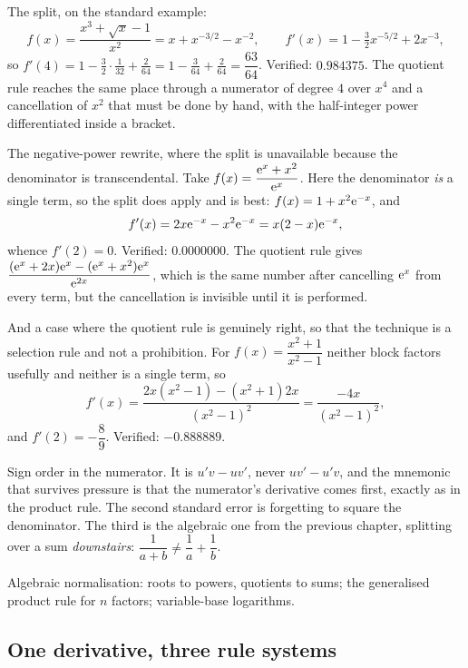 \begin{worked}
The split, on the standard example:
\[
f(x)=\frac{x^{3}+\sqrt{x}-1}{x^{2}}=x+x^{-3/2}-x^{-2},\qquad f'(x)=1-\tfrac32x^{-5/2}+2x^{-3},
\]
so $f'(4)=1-\tfrac32\cdot\tfrac{1}{32}+\tfrac{2}{64}=1-\tfrac{3}{64}+\tfrac{2}{64}=\dfrac{63}{64}$. Verified: $0.984375$. The quotient rule reaches the same place through a numerator of degree $4$ over $x^{4}$ and a cancellation of $x^{2}$ that must be done by hand, with the half-integer power differentiated inside a bracket.

The negative-power rewrite, where the split is unavailable because the denominator is transcendental. Take $f(x)=\dfrac{\mathrm{e}^{x}+x^{2}}{\mathrm{e}^{x}}$. Here the denominator \emph{is} a single term, so the split does apply and is best: $f(x)=1+x^{2}\mathrm{e}^{-x}$, and
\[
f'(x)=2x\mathrm{e}^{-x}-x^{2}\mathrm{e}^{-x}=x(2-x)\mathrm{e}^{-x},
\]
whence $f'(2)=0$. Verified: $0.0000000$. The quotient rule gives $\dfrac{(\mathrm{e}^{x}+2x)\mathrm{e}^{x}-(\mathrm{e}^{x}+x^{2})\mathrm{e}^{x}}{\mathrm{e}^{2x}}$, which is the same number after cancelling $\mathrm{e}^{x}$ from every term, but the cancellation is invisible until it is performed.

And a case where the quotient rule is genuinely right, so that the technique is a selection rule and not a prohibition. For $f(x)=\dfrac{x^{2}+1}{x^{2}-1}$ neither block factors usefully and neither is a single term, so
\[
f'(x)=\frac{2x(x^{2}-1)-(x^{2}+1)2x}{(x^{2}-1)^{2}}=\frac{-4x}{(x^{2}-1)^{2}},
\]
and $f'(2)=-\dfrac{8}{9}$. Verified: $-0.888889$.
\end{worked}

\begin{trap}
Sign order in the numerator. It is $u'v-uv'$, never $uv'-u'v$, and the mnemonic that survives pressure is that the numerator's derivative comes first, exactly as in the product rule. The second standard error is forgetting to square the denominator. The third is the algebraic one from the previous chapter, splitting over a sum \emph{downstairs}: $\dfrac{1}{a+b}\neq\dfrac1a+\dfrac1b$.
\end{trap}

\begin{seealsob}Algebraic normalisation: roots to powers, quotients to sums; the generalised product rule for $n$ factors; variable-base logarithms.\end{seealsob}

\subsection{One derivative, three rule systems}

